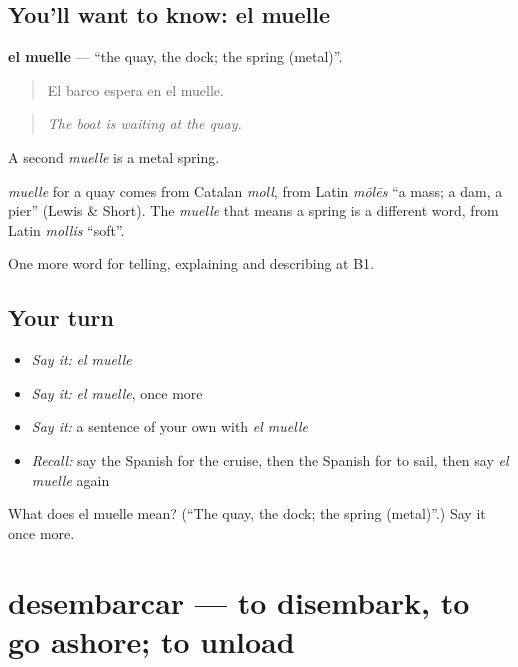 \subsection*{You'll want to know: el muelle}
\textbf{el muelle} — \textquotedblleft{}the quay, the dock; the spring (metal)\textquotedblright{}.

\begin{quote}
El barco espera en el muelle.
\end{quote}

\begin{quote}
\emph{The boat is waiting at the quay.}
\end{quote}

A second \emph{muelle} is a metal spring.

\begin{cousinweb}
\emph{muelle} for a quay comes from Catalan \emph{moll}, from Latin \emph{mōlēs} \textquotedblleft{}a mass; a dam, a pier\textquotedblright{} (Lewis \& Short). The \emph{muelle} that means a spring is a different word, from Latin \emph{mollis} \textquotedblleft{}soft\textquotedblright{}.
\end{cousinweb}

\begin{grammarlens}[title={What you've built}]
One more word for telling, explaining and describing at B1.
\end{grammarlens}

\subsection*{Your turn}
\begin{itemize}
\raggedright
  \item \emph{Say it:} \emph{el muelle}
  \item \emph{Say it:} \emph{el muelle}, once more
  \item \emph{Say it:} a sentence of your own with \emph{el muelle}
  \item \emph{Recall:} say the Spanish for the cruise, then the Spanish for to sail, then say \emph{el muelle} again
\end{itemize}

\begin{tcolorbox}[breakable,colback=teal!4,colframe=teal!35!black,title={Before you move on}]
What does el muelle mean? (\textquotedblleft{}The quay, the dock; the spring (metal)\textquotedblright{}.) Say it once more.
\end{tcolorbox}
\section[desembarcar]{desembarcar — to disembark, to go ashore; to unload}

